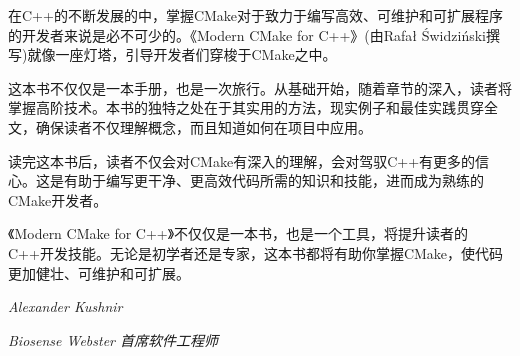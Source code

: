 
在C++的不断发展的中，掌握CMake对于致力于编写高效、可维护和可扩展程序的开发者来说是必不可少的。《Modern CMake for C++》(由Rafał Świdziński撰写)就像一座灯塔，引导开发者们穿梭于CMake之中。

这本书不仅仅是一本手册，也是一次旅行。从基础开始，随着章节的深入，读者将掌握高阶技术。本书的独特之处在于其实用的方法，现实例子和最佳实践贯穿全文，确保读者不仅理解概念，而且知道如何在项目中应用。

读完这本书后，读者不仅会对CMake有深入的理解，会对驾驭C++有更多的信心。这是有助于编写更干净、更高效代码所需的知识和技能，进而成为熟练的CMake开发者。

《Modern CMake for C++》不仅仅是一本书，也是一个工具，将提升读者的C++开发技能。无论是初学者还是专家，这本书都将有助你掌握CMake，使代码更加健壮、可维护和可扩展。

\begin{center}
\textit{Alexander Kushnir}

\textit{Biosense Webster 首席软件工程师}
\end{center}


